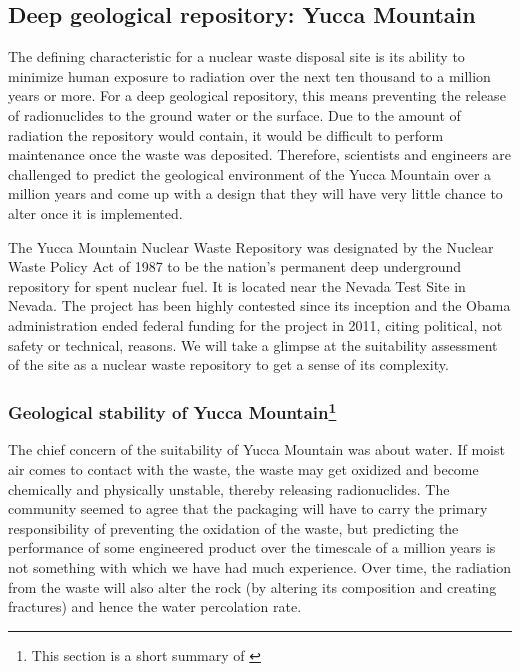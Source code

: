 \documentclass[nofootinbib,preprint,aps]{revtex4-1}
\begin{document}
    \subsection{Deep geological repository: Yucca Mountain}
        The defining characteristic for a nuclear waste disposal site is its ability to minimize human
        exposure to radiation over the next ten thousand to a million years or more.
        For a deep geological repository, this means preventing the release
        of radionuclides to the ground water or the surface.
        Due to the amount of radiation the repository would contain, it would be difficult to perform
        maintenance once the waste was deposited. Therefore, scientists and engineers are challenged
        to predict the geological environment of the Yucca Mountain over a million years and come up
        with a design that they will have very little chance to alter once it is implemented.

        The Yucca Mountain Nuclear Waste Repository was designated by the Nuclear Waste Policy Act
        of 1987 to be the nation's permanent deep underground repository for spent nuclear fuel. It is
        located near the Nevada Test Site in Nevada. The project has been highly contested since its
        inception and the Obama administration ended federal funding for the project in 2011, citing political,
        not safety or technical, reasons. We will take a glimpse at the suitability assessment of the site
        as a nuclear waste repository to get a sense of its complexity.

        \subsubsection{Geological stability of Yucca Mountain\footnote{This section is a short summary of \cite{m06}}}
        The chief concern of the suitability of Yucca Mountain was about water. If moist air comes to
        contact with the waste, the waste may get oxidized and become chemically and physically unstable, thereby
        releasing radionuclides.
        The community seemed to agree that the packaging will have to carry the primary
        responsibility of preventing the oxidation of the waste, but predicting the performance of some
        engineered product over the timescale of a million years is not something with which we have had much 
        experience. Over time, the radiation from the waste will also alter the rock (by altering its composition
        and creating fractures) and hence the water percolation rate.
\end{document}
